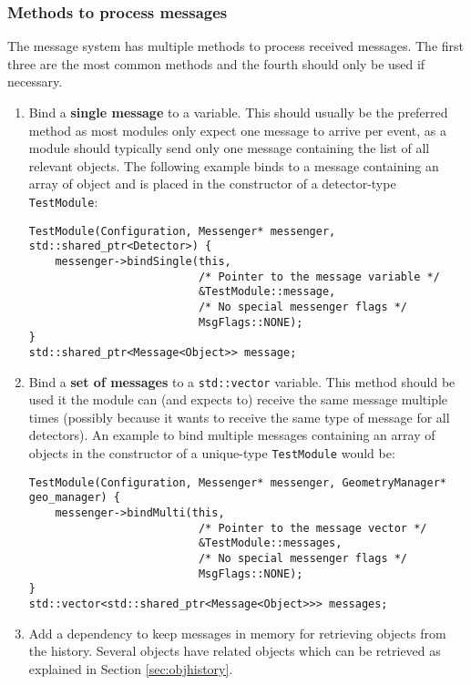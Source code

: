 \subsubsection{Methods to process messages}
The message system has multiple methods to process received messages.
The first three are the most common methods and the fourth should only be used if necessary.
\begin{enumerate}
\item Bind a \textbf{single message} to a variable.
This should usually be the preferred method as most modules only expect one message to arrive per event, as a module should typically send only one message containing the list of all relevant objects.
The following example binds to a message containing an array of object and is placed in the constructor of a detector-type \texttt{TestModule}:
\begin{verbatim}
TestModule(Configuration, Messenger* messenger, std::shared_ptr<Detector>) {
    messenger->bindSingle(this,
                          /* Pointer to the message variable */
                          &TestModule::message,
                          /* No special messenger flags */
                          MsgFlags::NONE);
}
std::shared_ptr<Message<Object>> message;
\end{verbatim}
\item Bind a \textbf{set of messages} to a \texttt{std::vector} variable.
This method should be used it the module can (and expects to) receive the same message multiple times (possibly because it wants to receive the same type of message for all detectors).
An example to bind multiple messages containing an array of objects in the constructor of a unique-type \texttt{TestModule} would be:
\begin{verbatim}
TestModule(Configuration, Messenger* messenger, GeometryManager* geo_manager) {
    messenger->bindMulti(this,
                          /* Pointer to the message vector */
                          &TestModule::messages,
                          /* No special messenger flags */
                          MsgFlags::NONE);
}
std::vector<std::shared_ptr<Message<Object>>> messages;
\end{verbatim}
\item Add a dependency to keep messages in memory for retrieving objects from the history.
Several objects have related objects which can be retrieved as explained in Section \ref{sec:objhistory}.

\end{enumerate}
